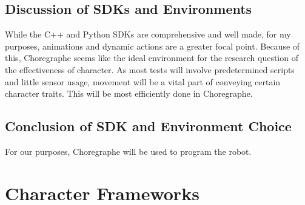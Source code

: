 \documentclass[onecolumn, draftclsnofoot,10pt, compsoc]{IEEEtran}
\begin{document}
\subsection{Discussion of SDKs and Environments}
While the C++ and Python SDKs are comprehensive and well made, for my purposes, animations and dynamic actions are a greater focal point.
Because of this, Choregraphe seems like the ideal environment for the research question of the effectiveness of character.
As most tests will involve predetermined scripts and little sensor usage, movement will be a vital part of conveying certain character traits. This will be most efficiently done in Choregraphe.

\subsection{Conclusion of SDK and Environment Choice}
For our purposes, Choregraphe will be used to program the robot.

\section{Character Frameworks}

\











\end{document}
